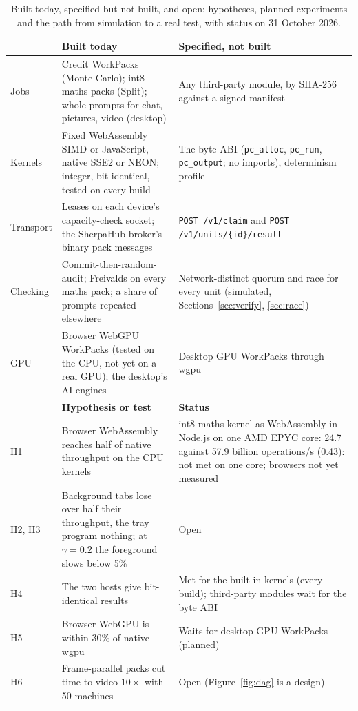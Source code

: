 \documentclass[11pt,a4paper]{article}
\theoremstyle{definition}
\theoremstyle{plain}
\begin{document}
\begin{table}[!htb]
\centering
\caption{Built today, specified but not built, and open: hypotheses, planned experiments and the path from simulation to a real test, with status on 31 October 2026.}\label{tab:exp}
\footnotesize
\begin{tabularx}{\linewidth}{@{}l>{\raggedright\arraybackslash}X>{\raggedright\arraybackslash}X@{}}
\toprule
 & \textbf{Built today} & \textbf{Specified, not built} \\
\midrule
Jobs & Credit WorkPacks (Monte Carlo); int8 maths packs (Split); whole prompts for chat, pictures, video (desktop) & Any third-party module, by SHA-256 against a signed manifest \\
Kernels & Fixed WebAssembly SIMD or JavaScript, native SSE2 or NEON; integer, bit-identical, tested on every build & The byte ABI (\texttt{pc\_alloc}, \texttt{pc\_run}, \texttt{pc\_output}; no imports), determinism profile \\
Transport & Leases on each device's capacity-check socket; the SherpaHub broker's binary pack messages & \texttt{POST /v1/claim} and \texttt{POST /v1/units/\{id\}/result} \\
Checking & Commit-then-random-audit; Freivalds on every maths pack; a share of prompts repeated elsewhere & Network-distinct quorum and race for every unit (simulated, Sections~\ref{sec:verify}, \ref{sec:race}) \\
GPU & Browser WebGPU WorkPacks (tested on the CPU, not yet on a real GPU); the desktop's AI engines & Desktop GPU WorkPacks through wgpu \\
\midrule
 & \textbf{Hypothesis or test} & \textbf{Status} \\
\midrule
H1 & Browser WebAssembly reaches half of native throughput on the CPU kernels & int8 maths kernel as WebAssembly in Node.js on one AMD EPYC core: 24.7 against 57.9 billion operations/s (0.43): not met on one core; browsers not yet measured \\
H2, H3 & Background tabs lose over half their throughput, the tray program nothing; at $\gamma=0.2$ the foreground slows below 5\% & Open \\
H4 & The two hosts give bit-identical results & Met for the built-in kernels (every build); third-party modules wait for the byte ABI \\
H5 & Browser WebGPU is within 30\% of native wgpu & Waits for desktop GPU WorkPacks (planned) \\
H6 & Frame-parallel packs cut time to video $10\times$ with 50 machines & Open (Figure~\ref{fig:dag} is a design) \\

\end{tabularx}
\end{table}
\end{document}
